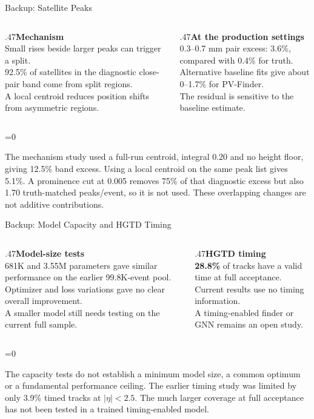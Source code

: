 \documentclass[xcolor=table,aspectratio=169]{beamer}
\providecommand{\talkbuild}{0}
\newcommand{\readingonly}[1]{\ifnum\talkbuild=0\relax#1\fi}
\newcommand{\readingnote}[1]{\readingonly{\par\vspace{.35em}%
  {\footnotesize\color{black!65}#1\par}}}
\begin{document}
\begin{frame}{Backup: Satellite Peaks}
\relax

\begin{columns}[t]
\begin{column}{.47\linewidth}\textbf{Mechanism}\\[.6em]\small
Small rises beside larger peaks can trigger a split.\\[.7em]
92.5\% of satellites in the diagnostic close-pair band come from split regions.\\[.7em]
A local centroid reduces position shifts from asymmetric regions.
\end{column}
\begin{column}{.47\linewidth}\textbf{At the production settings}\\[.6em]\small
0.3--0.7 mm pair excess: 3.6\%, compared with 0.4\% for truth.\\[.7em]
Alternative baseline fits give about 0--1.7\% for PV-Finder.\\[.7em]
The residual is sensitive to the baseline estimate.
\end{column}\end{columns}
\readingnote{The mechanism study used a full-run centroid, integral 0.20 and no height floor, giving 12.5\% band excess. Using a local centroid on the same peak list gives 5.1\%. A prominence cut at 0.005 removes 75\% of that diagnostic excess but also 1.70 truth-matched peaks/event, so it is not used. These overlapping changes are not additive contributions.}
\end{frame}


\begin{frame}{Backup: Model Capacity and HGTD Timing}
\relax

\begin{columns}[t]
\begin{column}{.47\linewidth}\textbf{Model-size tests}\\[.6em]\small
681K and 3.55M parameters gave similar performance on the earlier 99.8K-event pool.\\[.8em]
Optimizer and loss variations gave no clear overall improvement.\\[.8em]
A smaller model still needs testing on the current full sample.
\end{column}
\begin{column}{.47\linewidth}\textbf{HGTD timing}\\[.6em]\small
\textbf{28.8\%} of tracks have a valid time at full acceptance.\\[.8em]
Current results use no timing information.\\[.8em]
A timing-enabled finder or GNN remains an open study.
\end{column}\end{columns}
\readingnote{The capacity tests do not establish a minimum model size, a common optimum or a fundamental performance ceiling. The earlier timing study was limited by only 3.9\% timed tracks at $|\eta|<2.5$. The much larger coverage at full acceptance has not been tested in a trained timing-enabled model.}
\end{frame}
\end{document}
